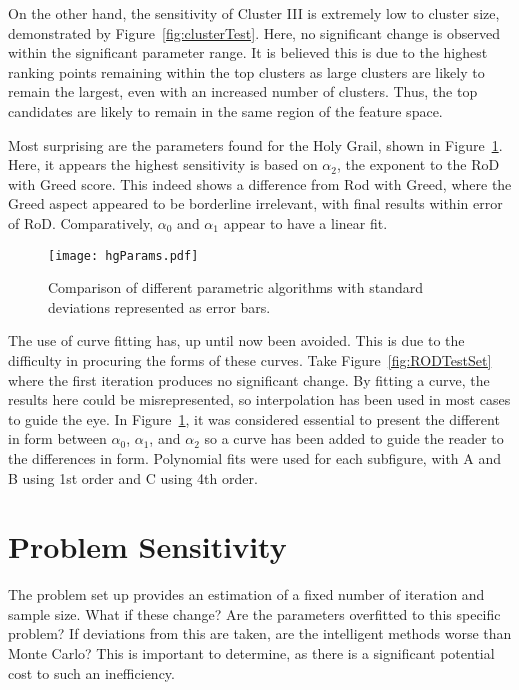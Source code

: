 On the other hand, the sensitivity of Cluster III is extremely low to cluster size, demonstrated by Figure~\ref{fig:clusterTest}. Here, no significant change is observed within the significant parameter range. It is believed this is due to the highest ranking points remaining within the top clusters as large clusters are likely to remain the largest, even with an increased number of clusters. Thus, the top candidates are likely to remain in the same region of the feature space.

Most surprising are the parameters found for the Holy Grail, shown in Figure~\ref{fig:paramHg}. Here, it appears the highest sensitivity is based on $\alpha_2$, the exponent to the RoD with Greed score. This indeed shows a difference from Rod with Greed, where the Greed aspect appeared to be borderline irrelevant, with final results within error of RoD. Comparatively, $\alpha_0$ and $\alpha_1$ appear to have a linear fit.

\begin{figure}[H]
    \begin{center}
        \texttt{[image: hgParams.pdf]}
        \caption[Non-parametric comparison]{Comparison of different parametric algorithms with standard deviations represented as error bars.}
        \label{fig:paramHg}
    \end{center}
\end{figure}

The use of curve fitting has, up until now been avoided. This is due to the difficulty in procuring the forms of these curves. Take Figure~\ref{fig:RODTestSet} where the first iteration produces no significant change. By fitting a curve, the results here could be misrepresented, so interpolation has been used in most cases to guide the eye. In Figure~\ref{fig:paramHg}, it was considered essential to present the different in form between ${\alpha_0}$, ${\alpha_1}$, and ${\alpha_2}$ so a curve has been added to guide the reader to the differences in form. Polynomial fits were used for each subfigure, with A and B using 1st order and C using 4th order.

\section{Problem Sensitivity}
The problem set up provides an estimation of a fixed number of iteration and sample size. What if these change? Are the parameters overfitted to this specific problem? If deviations from this are taken, are the intelligent methods worse than Monte Carlo? This is important to determine, as there is a significant potential cost to such an inefficiency.


